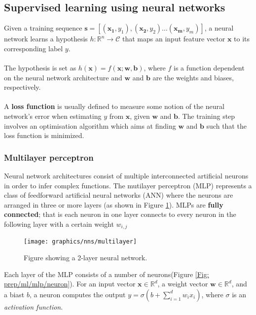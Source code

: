 	\subsection{Supervised learning using neural networks} \label{Section 2.2.2}
	Given a training sequence $\mathbf{s} = [(\mathbf{x_1}, y_1), (\mathbf{x_2}, y_2) \dots (\mathbf{x_m}, y_m)]$, a neural network learns a hypothesis $h: \mathbb{R}^n \rightarrow \mathcal{C}$ that maps an input feature vector $\mathbf{x}$ to its corresponding label $y$. 
	\\ \\ 
	The hypothesis is set as $h(\mathbf{x}) = f(\mathbf{x}; \mathbf{w}, \mathbf{b})$, where $f$ is a function dependent on the neural network architecture and $\mathbf{w}$ and $\mathbf{b}$ are the weights and biases, respectively. 
	\\ \\
	A \textbf{loss function} is usually defined to measure some notion of the neural network's error when estimating $y$ from $\mathbf{x}$, given $\mathbf{w}$ and $\mathbf{b}$. The training step involves an optimisation algorithm which aims at finding $\mathbf{w}$ and $\mathbf{b}$ such that the loss function is minimized. 
	
 	\subsubsection{Multilayer perceptron}  \label{Section 2.2.2.2}
	Neural network architectures consist of multiple interconnected artificial neurons in order to infer complex functions. The mutilayer perceptron (MLP) represents a class of feedforward artificial neural networks (ANN) where the neurons are arranged in three or more layers (as shown in Figure \ref{Fig: prep/ml/mlp/mlp}). MLPs are \textbf{fully connected}; that is each neuron in one layer connects to every neuron in the following layer with a certain weight $w_{i, j}$

	\begin{figure}[H]
		\centering
		\texttt{[image: graphics/nns/multilayer]}
		\caption[Multilayer perceptron]{
			Figure showing a 2-layer neural network.
		}
		\label{Fig: prep/ml/mlp/mlp}	
	\end{figure}	

	 Each layer of the MLP consists of a number of neurons(Figure \ref{Fig: prep/ml/mlp/neuron}). For an input vector $\mathbf{x}\in\mathbb{R}^d$, a weight vector $\mathbf{w}\in\mathbb{R}^d$, and a biast $b$, a neuron computes the output $y = \sigma(b + \sum_{i=1}^{d} w_i x_i)$, where $\sigma$ is an \textit{activation function}.
	
